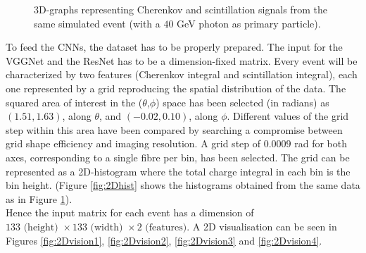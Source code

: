 \begin{figure}
	\centering
	 \quad
	\caption{3D-graphs representing Cherenkov and scintillation signals from the same simulated event (with a $40$ GeV photon as primary particle).}
	\label{fig:3Dgraph}
\end{figure}

To feed the CNNs, the dataset has to be properly prepared. The input for the VGGNet and the ResNet has to be a dimension-fixed matrix. Every event will be characterized by two features (Cherenkov integral and scintillation integral), each one represented by a grid reproducing the spatial distribution of the data.
The squared area of interest in the  ($\theta$,$\phi$) space has been selected (in radians) as $(1.51,1.63)$, along $\theta$, and $(-0.02,0.10)$, along $\phi$.
Different values of the grid step within this area have been compared by searching a compromise between grid shape efficiency and imaging resolution. A grid step of $0.0009$ rad for both axes, corresponding to a single fibre per bin, has been selected. The grid can be represented as a 2D-histogram where the total charge integral in each bin is the bin height. (Figure \ref{fig:2Dhist} shows the histograms obtained from the same data as in Figure \ref{fig:3Dgraph}).\\
Hence the input matrix for each event has a dimension of $133 \text{ (height) }\times 133\text{ (width) }\times 2\text{ (features)}$. A 2D visualisation can be seen in Figures \ref{fig:2Dvision1}, \ref{fig:2Dvision2}, \ref{fig:2Dvision3} and  \ref{fig:2Dvision4}.\\

